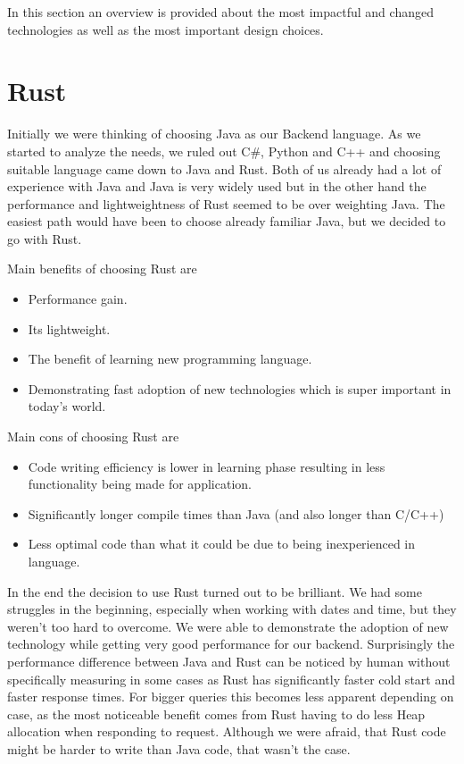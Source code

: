 In this section an overview is provided about the most impactful and changed technologies as well as the most important design choices.

\section{Rust}\label{sec:rust}
Initially we were thinking of choosing Java as our Backend language.
As we started to analyze the needs, we ruled out C\#, Python and C++ and choosing suitable language came down to Java and Rust.
Both of us already had a lot of experience with Java and Java is very widely used but in the other hand the performance and lightweightness of Rust seemed to be over weighting Java.
The easiest path would have been to choose already familiar Java, but we decided to go with Rust.

Main benefits of choosing Rust are
\begin{itemize}
    \item Performance gain.
    \item Its lightweight.
    \item The benefit of learning new programming language.
    \item Demonstrating fast adoption of new technologies which is super important in today's world.
\end{itemize}

Main cons of choosing Rust are
\begin{itemize}
    \item Code writing efficiency is lower in learning phase resulting in less functionality being made for application.
    \item Significantly longer compile times than Java (and also longer than C/C++)
    \item Less optimal code than what it could be due to being inexperienced in language.
\end{itemize}

In the end the decision to use Rust turned out to be brilliant.
We had some struggles in the beginning, especially when working with dates and time, but they weren't too hard to overcome.
We were able to demonstrate the adoption of new technology while getting very good performance for our backend.
Surprisingly the performance difference between Java and Rust can be noticed by human without specifically measuring in some cases
as Rust has significantly faster cold start and faster response times.
For bigger queries this becomes less apparent depending on case, as the most noticeable benefit comes from Rust
having to do less Heap allocation when responding to request.
Although we were afraid, that Rust code might be harder to write than Java code, that wasn't the case.

